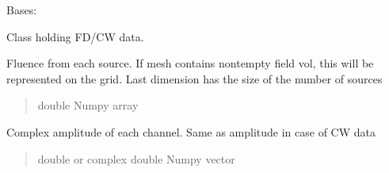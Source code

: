 \documentclass[letterpaper,10pt,english]{sphinxmanual}
\begin{document}
\begin{fulllineitems}
\label{\detokenize{_autosummary/nirfasterff.base.data.FDdata:nirfasterff.base.data.FDdata}}
\pysigstartsignatures
\pysigline
{}
\pysigstopsignatures
\sphinxAtStartPar
Bases: 

\sphinxAtStartPar
Class holding FD/CW data.

\begin{fulllineitems}
\label{\detokenize{_autosummary/nirfasterff.base.data.FDdata:nirfasterff.base.data.FDdata.phi}}
\pysigstartsignatures
\pysigline
{}
\pysigstopsignatures
\sphinxAtStartPar
Fluence from each source. If mesh contains non\sphinxhyphen{}tempty field vol, this will be represented on the grid. Last dimension has the size of the number of sources
\begin{quote}\begin{description}
\sphinxAtStartPar
double Numpy array

\end{description}\end{quote}

\end{fulllineitems}


\begin{fulllineitems}
\label{\detokenize{_autosummary/nirfasterff.base.data.FDdata:nirfasterff.base.data.FDdata.complex}}
\pysigstartsignatures
\pysigline
{}
\pysigstopsignatures
\sphinxAtStartPar
Complex amplitude of each channel. Same as amplitude in case of CW data
\begin{quote}\begin{description}
\sphinxAtStartPar
double or complex double Numpy vector

\end{description}\end{quote}

\end{fulllineitems}



\end{fulllineitems}
\end{document}
